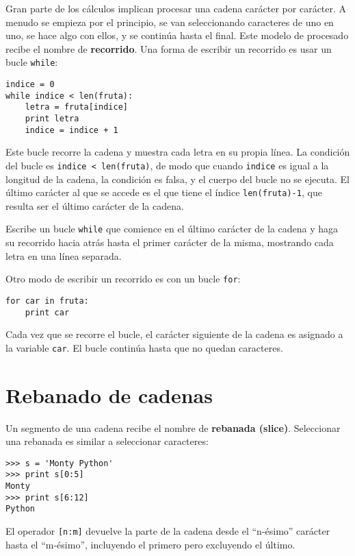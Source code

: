 Gran parte de los cálculos implican procesar una cadena carácter por
carácter. A menudo se empieza por el principio, se van seleccionando caracteres
de uno en uno, se hace algo con ellos, y se continúa hasta el final. Este modelo
de procesado recibe el nombre de {\bf recorrido}. Una forma de escribir un recorrido
es usar un bucle {\tt while}:

\beforeverb
\begin{verbatim}
indice = 0
while indice < len(fruta):
    letra = fruta[indice]
    print letra
    indice = indice + 1
\end{verbatim}
\afterverb
%
Este bucle recorre la cadena y muestra cada letra en su propia línea.
La condición del bucle es {\tt indice < len(fruta)}, de modo
que cuando {\tt indice} es igual a la longitud de la cadena, la
condición es falsa, y el cuerpo del bucle no se ejecuta. El
último carácter al que se accede es el que tiene el índice {\tt len(fruta)-1},
que resulta ser el último carácter de la cadena.

\begin{ex}
Escribe un bucle {\tt while} que comience en el último carácter de la cadena
y haga su recorrido hacia atrás hasta el primer carácter de la misma,
mostrando cada letra en una línea separada.
\end{ex}

Otro modo de escribir un recorrido es con un bucle {\tt for}:

\beforeverb
\begin{verbatim}
for car in fruta:
    print car
\end{verbatim}
\afterverb
%
Cada vez que se recorre el bucle, el carácter siguiente de la cadena es asignado
a la variable {\tt car}. El bucle continúa hasta que no quedan caracteres.


\section{Rebanado de cadenas}
\label{slice}


Un segmento de una cadena recibe el nombre de {\bf rebanada (slice)}.
Seleccionar una rebanada es similar a seleccionar caracteres:

\beforeverb
\begin{verbatim}
>>> s = 'Monty Python'
>>> print s[0:5]
Monty
>>> print s[6:12]
Python
\end{verbatim}
\afterverb
%
El operador {\tt [n:m]} devuelve la parte de la cadena desde el
``n-ésimo'' carácter hasta el ``m-ésimo'', incluyendo el primero
pero excluyendo el último.


